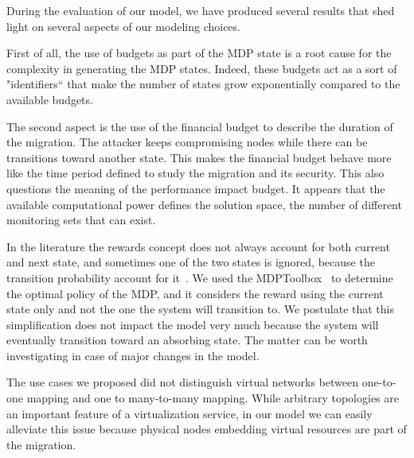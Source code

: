 \label{sec:mdp-discussion}
During the evaluation of our model, we have produced several results that shed light on several aspects of our modeling choices.

First of all, the use of budgets as part of the MDP state is a root cause for the complexity in generating the MDP states. Indeed, these budgets act as a sort of "identifiers`` that make the number of states grow exponentially compared to the available budgets.

The second aspect is the use of the financial budget to describe the duration of the migration. The attacker keeps compromising nodes while there can be transitions toward another state. This makes the financial budget behave more like the time period defined to study the migration and its security. This also questions the meaning of the performance impact budget. It appears that the available computational power defines the solution space, \ie the number of different monitoring sets that can exist. 

In the literature the rewards concept does not always account for both current and next state, and sometimes one of the two states is ignored, because the transition probability account for it~\cite{rewardfunc}. We used the MDPToolbox~\cite{Chades2014} to determine the optimal policy  of the MDP, and it considers the reward using the current state only and not the one the system will transition to. We postulate that this simplification does not impact the model very much because the system will eventually transition toward an absorbing state.
The matter can be worth investigating in case of major changes in the model.

The use cases we proposed did not distinguish virtual networks between one-to-one mapping and one to many-to-many mapping. While arbitrary topologies are an important feature of a virtualization service, in our model we can easily alleviate this issue because physical nodes embedding virtual resources are part of the migration.
